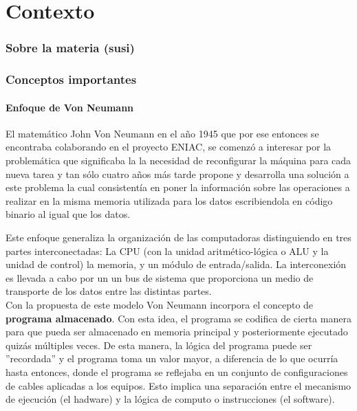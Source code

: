 \part{Contexto}
\section{Sobre la materia \orga (susi)}

\section{Conceptos importantes}

\subsection{Enfoque de Von Neumann}

El matemático John Von Neumann en el año 1945 que por ese entonces se encontraba colaborando en el proyecto  ENIAC, se comenzó a interesar por la problemática que significaba la la necesidad de reconfigurar la máquina para cada nueva tarea y tan sólo cuatro años más tarde propone y desarrolla una solución a este problema la cual consistentía en poner la información sobre las operaciones a realizar en la misma memoria utilizada para los datos escribiendola en código binario al igual que los datos.

Este enfoque generaliza la organización de las computadoras distinguiendo en tres partes interconectadas: La CPU (con la unidad aritmético-lógica o ALU y la unidad de control) la memoria, y un módulo de entrada/salida. La interconexión es llevada a cabo por un un bus de sistema que proporciona un medio de transporte de los datos entre las distintas partes. \\

Con la propuesta de este modelo Von Neumann incorpora el concepto de \textbf{programa almacenado}. Con esta idea, el programa se codifica de cierta manera para que pueda ser almacenado en memoria principal y posteriormente ejecutado quizás múltiples veces. De esta manera, la lógica del programa puede ser ''recordada'' y el programa toma un valor mayor, a diferencia de lo que ocurría hasta entonces, donde el programa se reflejaba en un conjunto de configuraciones de cables aplicadas a los equipos. Esto implica una separación entre el mecanismo de ejecución (el hadware) y la lógica de computo o instrucciones (el software).

